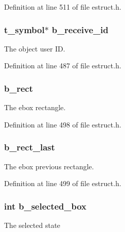 Definition at line 511 of file estruct.\-h.

\hypertarget{struct__edspbox_a3fb2b6968877ffd009753ccc0fe96769}{
\subsubsection[{b\-\_\-receive\-\_\-id}]{\setlength{\rightskip}{0pt plus 5cm}t\-\_\-symbol$\ast$ b\-\_\-receive\-\_\-id}}\label{struct__edspbox_a3fb2b6968877ffd009753ccc0fe96769}
The object user I\-D. 

Definition at line 487 of file estruct.\-h.

\hypertarget{struct__edspbox_abc70ff46c135ee9f377a038bbc05a33e}{
\subsubsection[{b\-\_\-rect}]{ b\-\_\-rect}}\label{struct__edspbox_abc70ff46c135ee9f377a038bbc05a33e}
The ebox rectangle. 

Definition at line 498 of file estruct.\-h.

\hypertarget{struct__edspbox_a2a0a15d3bc005cd4f815088b230b5ebd}{
\subsubsection[{b\-\_\-rect\-\_\-last}]{ b\-\_\-rect\-\_\-last}}\label{struct__edspbox_a2a0a15d3bc005cd4f815088b230b5ebd}
The ebox previous rectangle. 

Definition at line 499 of file estruct.\-h.

\hypertarget{struct__edspbox_acc1a127070b19ccf6e222d7349c84c96}{
\subsubsection[{b\-\_\-selected\-\_\-box}]{\setlength{\rightskip}{0pt plus 5cm}int b\-\_\-selected\-\_\-box}}\label{struct__edspbox_acc1a127070b19ccf6e222d7349c84c96}
The selected state 

